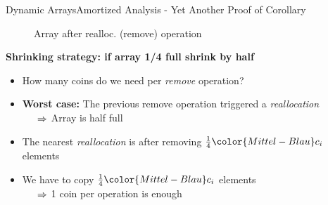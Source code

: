 
\begin{frame}{Dynamic Arrays}{Amortized Analysis -
    Yet Another Proof of Corollary}
  \vspace{-2.0em}
  \begin{figure}[!h]%
    \def\FSAsize{14}\def\FSAelements{0}%
    \def\FSAcopy{7}\def\FSAdelete{1}\def\FSAinsert{0}%
    \def\FSAcopyarrow{1}%
    \def\FSAinsertarrow{1}%
    \def\FSAlabelsize{\raisebox{1.75em}{$\begin{array}{c}
        {\color{Mittel-Blau}s_{i-1}-1}\\
        \text{old elements}
        \end{array}$}}%
    \def\FSAlabelinsertcapacity{removed elements}%
    \def\FSAlabelcapacity{${\color{Mittel-Blau}c_i}
      = \frac{1}{2} \cdot {\color{Mittel-Blau}c_{i-1}}$}%
    \vspace{-0.5em}%
    \caption{Array after realloc. (remove) operation}
    \label{fig:dynamic_fields:amortized_analysis:yapoc_array_shrink}
  \end{figure}
  \vspace*{-1.0em}
    \textbf{Shrinking strategy: if array 1/4 full shrink by half}
  \begin{itemize}
  \item
    How many coins do we need per \textit{remove} operation?
  \item
    \textbf{Worst case:}
    The previous remove operation triggered a \textit{reallocation}\\
    $\hspace{1.5em}\Rightarrow$ Array is half full
    \item
      The nearest \textit{reallocation} is after removing
      $\frac{1}{4} {\color{Mittel-Blau}c_i}$ elements
    \item
      We have to copy $\frac{1}{4} {\color{Mittel-Blau}c_i}$ elements\\
      $\hspace{1.5em}\Rightarrow$ 1 coin per operation is enough
  \end{itemize}
\end{frame}

